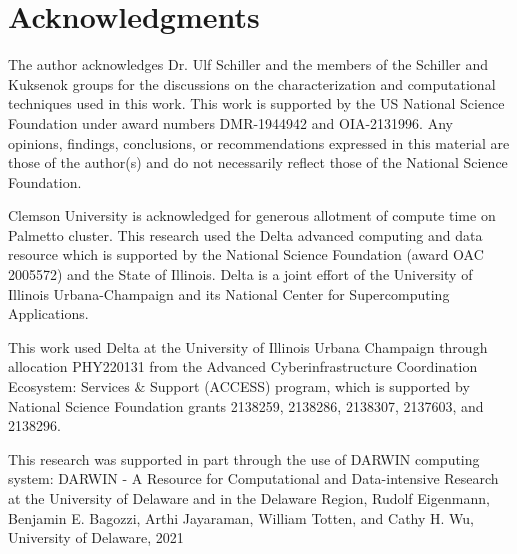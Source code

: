 
\section{Acknowledgments}

The author acknowledges Dr. Ulf Schiller and the members of the Schiller and Kuksenok groups for the discussions on 
the characterization and computational techniques used in this work. This work is supported by the US National Science 
Foundation under award numbers DMR-1944942 and OIA-2131996. Any opinions, findings, conclusions, or recommendations 
expressed in this material are those of the author(s) and do not necessarily reflect those of the National Science 
Foundation.  

Clemson University is acknowledged for generous allotment of compute time on Palmetto cluster. This research used the 
Delta advanced computing and data resource which is supported by the National Science Foundation (award OAC 2005572) 
and the State of Illinois. Delta is a joint effort of the University of Illinois Urbana-Champaign and its National 
Center for Supercomputing Applications. 

This work used Delta at the University of Illinois Urbana Champaign through allocation PHY220131 from the Advanced 
Cyberinfrastructure Coordination Ecosystem: Services $\&$ Support (ACCESS) program, which is supported by National 
Science Foundation grants 2138259, 2138286, 2138307, 2137603, and 2138296. 

This research was supported in part through the use of DARWIN computing system: DARWIN - A Resource for Computational 
and Data-intensive Research at the University of Delaware and in the Delaware Region, Rudolf Eigenmann, Benjamin E. 
Bagozzi, Arthi Jayaraman, William Totten, and Cathy H. Wu, University of Delaware, 2021